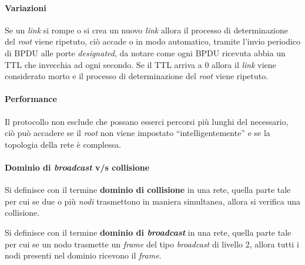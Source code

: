         \paragraph{Variazioni} Se un \textit{link} si rompe o si crea un nuovo \textit{link} allora il processo di determinazione del \textit{root} viene ripetuto, ciò accade o in modo automatico, tramite l'invio periodico di \Acrshort*{BPDU} alle porte \textit{designated}, da notare come ogni \Acrshort*{BPDU} ricevuta abbia un \Acrshort*{TTL} che invecchia ad ogni secondo. Se il \Acrshort*{TTL} arriva a $0$ allora il \textit{link} viene considerato morto e il processo di determinazione del \textit{root} viene ripetuto. 
        \paragraph{Performance} Il protocollo non esclude che possano esserci percorsi più lunghi del necessario, ciò può accadere se il \textit{root} non viene impostato ``intelligentemente'' e se la topologia della rete è complessa. 
        \paragraph{Dominio di \textit{broadcast} v/s collisione} 
            \begin{definition}
                Si definisce con il termine \textbf{dominio di collisione} in una rete, quella parte tale per cui se due o più \textit{nodi} trasmettono in maniera simultanea, allora si verifica una collisione.
            \end{definition}
            \begin{definition}
                Si definisce con il termine \textbf{dominio di \textit{broadcast}} in una rete, quella parte tale per cui se un nodo trasmette un \textit{frame} del tipo \textit{broadcast} di livello 2, allora tutti i nodi presenti nel dominio ricevono il \textit{frame}.
            \end{definition}
